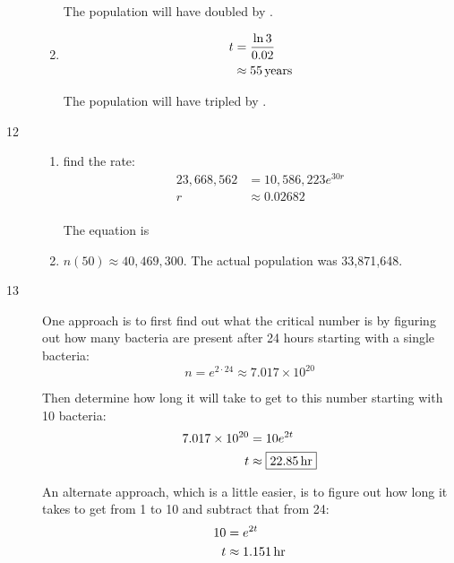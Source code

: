 \documentclass{exam}
\begin{document}
\begin{description}
\begin{enumerate}[a]
            The population will have doubled by .

          \item 
            \begin{align*}
              t & = \frac{\ln 3}{0.02} \\
                & \approx \unit[55]{years} \\
            \end{align*}

            The population will have tripled by .
        \end{enumerate}

      \item[12] 
        \begin{enumerate}[a]
          \item 
            find the rate:
            \begin{align*}
              23,668,562 & = 10,586,223 e^{30r} \\
              r          & \approx 0.02682 \\
            \end{align*}

            The equation is 

          \item $n(50) \approx \boxed{40,469,300}$.  The actual population was 33,871,648.
        \end{enumerate}

      \item[13] 
        One approach is to first find out what the critical number is by figuring out how many bacteria are present
        after 24 hours starting with a single bacteria:
        \[
          n = e^{2 \cdot 24} \approx 7.017 \times 10^{20}
        \]
        
        Then determine how long it will take to get to this number starting with 10 bacteria:
        \begin{align*}
          7.017 \times 10^{20} & = 10 e^{2t} \\
          t                    & \approx \boxed{\unit[22.85]{hr}} \\
        \end{align*}

        An alternate approach, which is a little easier, is to figure out how long it takes to get from 1 to 10 and
        subtract that from 24:
        \begin{align*}
          10 & = e^{2t} \\
          t  & \approx \unit[1.151]{hr} \\
        \end{align*}


\end{description}
\end{document}
